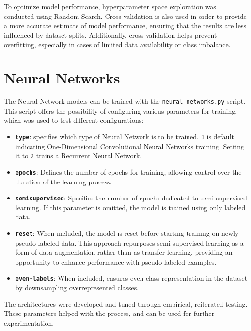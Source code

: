 To optimize model performance, hyperparameter space exploration was conducted
using Random Search.
Cross-validation is also used in order to provide a more accurate
estimate of model performance, ensuring that the results are less influenced
by dataset splits. Additionally, cross-validation helps prevent overfitting,
especially in cases of limited data availability or class imbalance. 



\section*{Neural Networks}
The Neural Network models can be trained with the \texttt{neural\_networks.py}
script. This script offers the possibility of configuring various parameters for
training, which was used to test different configurations:
\begin{itemize}
    \item \textbf{\texttt{type}}: specifies which type of Neural
    Network is to be trained. \texttt{1} is default, indicating
    One-Dimensional Convolutional Neural Networks training.
    Setting it to \texttt{2} trains a Recurrent Neural Network.

    \item \textbf{\texttt{epochs}}: Defines the number of epochs for training,
    allowing control over the duration of the learning process.

    \item \textbf{\texttt{semisupervised}}: Specifies the number of epochs
    dedicated to semi-supervised learning. If this parameter is omitted,
    the model is trained using only labeled data.

    \item \textbf{\texttt{reset}}: When included, the model is reset before
    starting training on newly pseudo-labeled data. This approach repurposes
    semi-supervised learning as a form of data augmentation rather than as
    transfer learning, providing an opportunity to enhance performance with
    pseudo-labeled examples.
    
    \item \textbf{\texttt{even-labels}}: When included, ensures even class
    representation in the dataset by downsampling overrepresented classes.
\end{itemize}

The architectures were developed and tuned through empirical,
reiterated testing. These parameters helped with the process, and can
be used for further experimentation.

